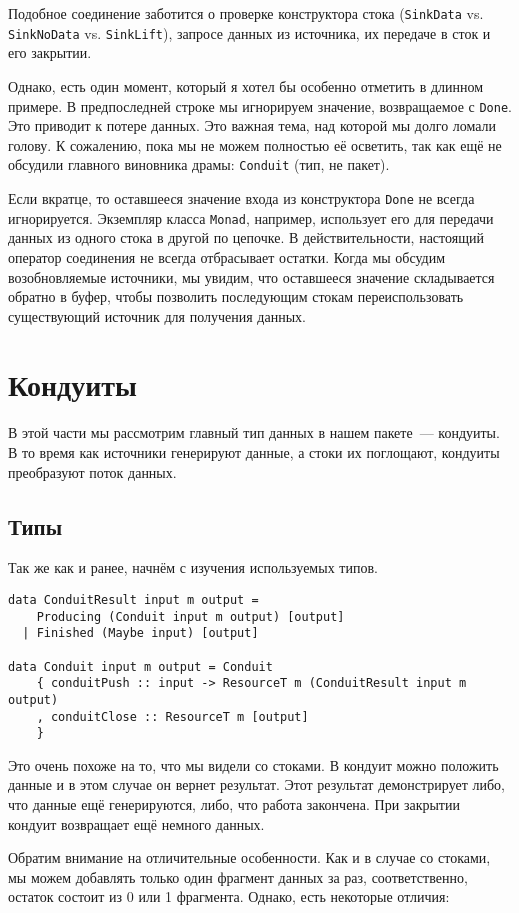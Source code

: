 Подобное соединение заботится о проверке конструктора стока (\lstinline'SinkData' vs. 
\lstinline'SinkNoData' vs. \lstinline'SinkLift'), запросе данных из источника, их передаче
в сток и его закрытии.

Однако, есть один момент, который я хотел бы особенно отметить в длинном примере. В предпоследней строке
мы игнорируем значение, возвращаемое с \lstinline'Done'. Это приводит
к потере данных. Это важная тема, над которой мы долго ломали голову. К сожалению,
пока мы не можем полностью её осветить, так как ещё не обсудили главного виновника
драмы: \lstinline'Conduit' (тип, не пакет). 

Если вкратце, то оставшееся значение входа из конструктора \lstinline{Done} не всегда игнорируется. Экземпляр класса \lstinline{Monad},
например, использует его для передачи данных из одного стока в другой по цепочке.
В действительности, настоящий оператор соединения не всегда отбрасывает остатки. Когда мы
обсудим возобновляемые источники, мы
увидим, что оставшееся значение складывается обратно в буфер, чтобы позволить последующим
стокам переиспользовать существующий источник для получения данных.

\section{Кондуиты}
В этой части мы рассмотрим главный тип данных в нашем пакете~--- кондуиты. В то время как
источники генерируют данные, а стоки их поглощают, кондуиты преобразуют поток данных.

\subsection{Типы}
Так же как и ранее, начнём с изучения используемых типов.
\begin{lstlisting}
data ConduitResult input m output =
    Producing (Conduit input m output) [output]
  | Finished (Maybe input) [output]

data Conduit input m output = Conduit
    { conduitPush :: input -> ResourceT m (ConduitResult input m output)
    , conduitClose :: ResourceT m [output]
    }
\end{lstlisting}
Это очень похоже на то, что мы видели со стоками. В кондуит можно положить данные и в этом
случае он вернет результат. Этот результат демонстрирует либо, что данные ещё
генерируются, либо, что работа закончена. При закрытии кондуит возвращает ещё немного данных.

Обратим внимание на отличительные особенности. Как и в случае со стоками, мы можем
добавлять только один фрагмент данных за раз, соответственно, остаток состоит из 0 или 1 фрагмента.
Однако, есть некоторые отличия:

